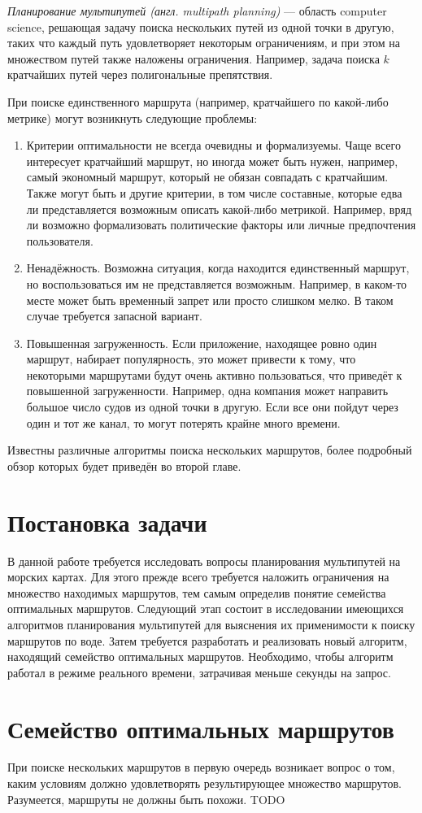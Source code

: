 \emph{Планирование мультипутей (англ. multipath planning)} ---
область computer science, решающая задачу поиска нескольких путей из
одной точки в другую, таких что каждый путь удовлетворяет некоторым
ограничениям, и при этом на множеством путей также наложены
ограничения. Например, задача поиска $k$ кратчайших путей через
полигональные препятствия.

При поиске единственного маршрута (например, кратчайшего по какой-либо
метрике) могут возникнуть следующие проблемы:
\begin{enumerate}
    \item Критерии оптимальности не всегда очевидны и формализуемы.
      Чаще всего интересует кратчайший маршрут, но иногда может быть
      нужен, например, самый экономный маршрут, который не обязан
      совпадать с кратчайшим. Также могут быть и другие критерии, в
      том числе составные, которые едва ли представляется возможным
      описать какой-либо метрикой. Например, вряд ли возможно
      формализовать политические факторы или личные предпочтения пользователя.
    \item Ненадёжность. Возможна ситуация, когда находится
      единственный маршрут, но воспользоваться им не представляется
      возможным. Например, в каком-то месте может быть временный
      запрет или просто слишком мелко. В таком случае требуется
      запасной вариант.
    \item Повышенная загруженность. Если приложение, находящее ровно
      один маршрут, набирает популярность, это может привести к тому,
      что некоторыми маршрутами будут очень активно пользоваться, что
      приведёт к повышенной загруженности. Например, одна компания
      может направить большое число судов из одной точки в другую.
      Если все они пойдут через один и тот же канал, то могут потерять
      крайне много времени.
\end{enumerate}

Известны различные алгоритмы поиска нескольких маршрутов, более
подробный обзор которых будет приведён во второй главе.

\FloatBarrier
\section{Постановка задачи}

В данной работе требуется исследовать вопросы планирования
мультипутей на морских картах. Для этого прежде всего требуется
наложить ограничения на множество находимых маршрутов, тем самым
определив понятие семейства оптимальных маршрутов. Следующий этап
состоит в исследовании имеющихся алгоритмов планирования мультипутей
для выяснения их применимости к поиску маршрутов по воде. Затем
требуется разработать и реализовать новый алгоритм, находящий
семейство оптимальных маршрутов. Необходимо, чтобы алгоритм работал в
режиме реального времени, затрачивая меньше секунды на запрос.

\FloatBarrier
\section{Семейство оптимальных маршрутов}

При поиске нескольких маршрутов в первую очередь возникает вопрос о
том, каким условиям должно удовлетворять результирующее множество
маршрутов. Разумеется, маршруты не должны быть похожи. TODO

